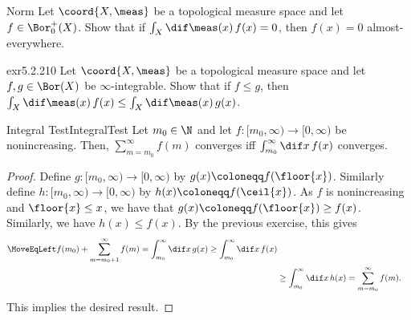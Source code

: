 \begin{exr}{}{Norm}
Let $\coord{X,\meas}$ be a topological measure space and let $f\in \Bor _0^+(X)$.  Show that if $\int _X\dif \meas (x)\, f(x)=0$, then $f(x)=0$ almost-everywhere.
\end{exr}
\begin{exr}{}{exr5.2.210}
Let $\coord{X,\meas}$ be a topological measure space and let $f,g\in \Bor (X)$ be $\infty$-integrable.  Show that if $f\leq g$, then $\int _X\dif \meas (x)\, f(x)\leq \int _X\dif \meas (x)\, g(x)$.
\end{exr}
\begin{prp}{Integral Test}{IntegralTest}
Let $m_0\in \N$ and let $f\colon [m_0,\infty )\rightarrow  [0,\infty )$ be nonincreasing.  Then, $\sum _{m=m_0}^{\infty}f(m)$ converges iff $\int _{m_0}^{\infty}\dif x\, f(x)$ converges.
\begin{proof}
Define $g\colon [m_0,\infty )\rightarrow [0,\infty )$ by $g(x)\coloneqq f(\floor{x})$.  Similarly define $h\colon [m_0,\infty )\rightarrow [0,\infty )$ by $h(x)\coloneqq f(\ceil{x})$.  As $f$ is nonincreasing and $\floor{x}\leq x$, we have that $g(x)\coloneqq f(\floor{x})\geq f(x)$.  Similarly, we have $h(x)\leq f(x)$.  By the previous exercise, this gives
\begin{equation}
\begin{split}
\MoveEqLeft
f(m_0)+\sum _{m=m_0+1}^{\infty}f(m)=\int _{m_0}^{\infty}\dif x\, g(x)\geq \int _{m_0}^{\infty}\dif x\, f(x) \\
& \geq \int _{m_0}^{\infty}\dif x\, h(x)=\sum _{m=m_0}^{\infty}f(m).
\end{split}
\end{equation}
This implies the desired result.
\end{proof}
\end{prp}

